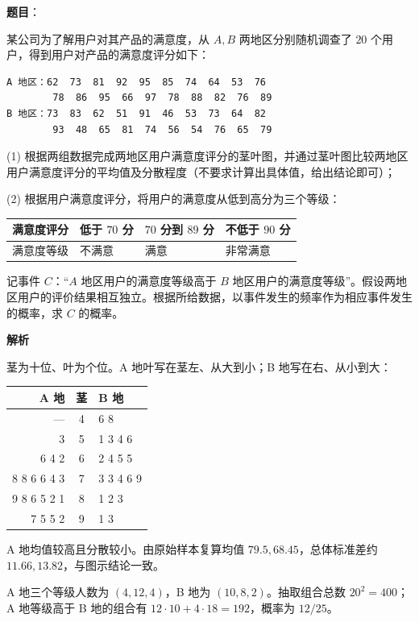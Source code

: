 \begin{answer}

\textbf{题目}：

某公司为了解用户对其产品的满意度，从 $A,B$ 两地区分别随机调查了 $20$ 个用户，得到用户对产品的满意度评分如下：

\begin{verbatim}
A 地区：62  73  81  92  95  85  74  64  53  76
        78  86  95  66  97  78  88  82  76  89
B 地区：73  83  62  51  91  46  53  73  64  82
        93  48  65  81  74  56  54  76  65  79
\end{verbatim}

(1) 根据两组数据完成两地区用户满意度评分的茎叶图，并通过茎叶图比较两地区用户满意度评分的平均值及分散程度（不要求计算出具体值，给出结论即可）；
\nopagebreak[4]
\begin{center}\end{center}
\nopagebreak[4]
(2) 根据用户满意度评分，将用户的满意度从低到高分为三个等级：

\begin{center}
\begin{tabular}{llll}
\toprule
满意度评分 & 低于 $70$ 分 & $70$ 分到 $89$ 分 & 不低于 $90$ 分 \\
\midrule
满意度等级 & 不满意 & 满意 & 非常满意 \\
\bottomrule
\end{tabular}
\end{center}

记事件 $C$：“$A$ 地区用户的满意度等级高于 $B$ 地区用户的满意度等级”。假设两地区用户的评价结果相互独立。根据所给数据，以事件发生的频率作为相应事件发生的概率，求 $C$ 的概率。

\textbf{解析}


茎为十位、叶为个位。A 地叶写在茎左、从大到小；B 地写在右、从小到大：

\begin{center}
\begin{tabular}{rcl}
\toprule
A 地 & 茎 & B 地 \\
\midrule
— & 4 & 6 8 \\
3 & 5 & 1 3 4 6 \\
6 4 2 & 6 & 2 4 5 5 \\
8 8 6 6 4 3 & 7 & 3 3 4 6 9 \\
9 8 6 5 2 1 & 8 & 1 2 3 \\
7 5 5 2 & 9 & 1 3 \\
\bottomrule
\end{tabular}
\end{center}

A 地均值较高且分散较小。由原始样本复算均值 $79.5,68.45$，总体标准差约 $11.66,13.82$，与图示结论一致。


A 地三个等级人数为 $(4,12,4)$，B 地为 $(10,8,2)$。抽取组合总数 $20^2=400$；A 地等级高于 B 地的组合有 $12\cdot10+4\cdot18=192$，概率为 $12/25$。



\end{answer}
